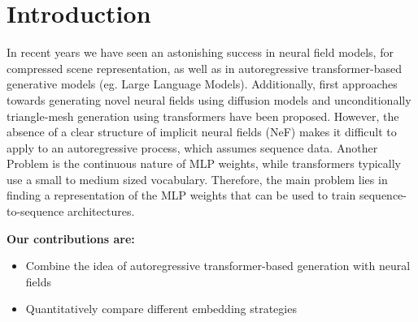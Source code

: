 \section{Introduction}
\label{sec:intro}

In recent years we have seen an astonishing success in neural field models, for compressed scene representation, as well as in autoregressive
transformer-based generative models (eg. Large Language Models).
Additionally, first approaches towards generating novel neural fields using diffusion models \cite{erkoç2023hyperdiffusion} and unconditionally triangle-mesh generation using transformers \cite{siddiqui2023meshgpt} have been proposed.
However, the absence of a clear structure of implicit neural fields (NeF) makes it difficult to apply to an autoregressive process, which assumes sequence data. Another Problem is the continuous nature of MLP weights, while transformers typically use a small to medium sized vocabulary.
Therefore, the main problem lies in finding a representation of the MLP weights that can be used to train sequence-to-sequence architectures.

\noindent \textbf{Our contributions are:}
\begin{itemize}
  \item Combine the idea of autoregressive transformer-based generation with neural fields
  \item Quantitatively compare different embedding strategies
\end{itemize}

